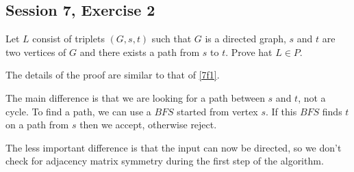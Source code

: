\subsection {Session 7, Exercise 2}


Let $L$ consist of triplets $(G,s,t)$ such that $G$ is a directed graph, $s$ and $t$ are two vertices of $G$ and there exists a path from $s$ to $t$. Prove hat $L \in{} P$.


The details of the proof are similar to that of \ref{7f1}.

The main difference is that we are looking for a path between $s$ and $t$, not a cycle. To find a path, we can use a $BFS$ started from vertex $s$. If this $BFS$ finds $t$ on a path from $s$ then we accept, otherwise reject.

The less important difference is that the input can now be directed, so we don't check for adjacency matrix symmetry during the first step of the algorithm.